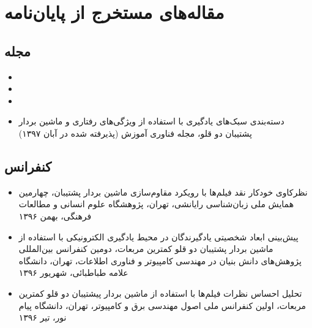 
{}

\chapter*{مقاله‌های مستخرج از پایان‌نامه}

\section*{مجله}
\begin{LTR}
	\begin{itemize}[label=$\bullet$]
		\item {}
		\item {}
		\item {}
	\end{itemize}
\end{LTR}

\begin{itemize}[label=$\bullet$]
	\item دسته‌بندی سبک‌های یادگیری با استفاده از ویژگی‌های رفتاری و ماشین بردار پشتیبان دو قلو، مجله فناوری آموزش (پذیرفته شده در آبان ۱۳۹۷)
\end{itemize}

\section*{کنفرانس}
\begin{itemize}[label=$\bullet$]
	\item نظرکاوی خودکار نقد فیلم‌ها با رویکرد مقاوم‌سازی ماشین بردار پشتیبان، چهارمین همایش ملی زبان‌شناسی رایانشی، تهران، پژوهشگاه علوم انسانی و مطالعات فرهنگی، بهمن ۱۳۹۶
	\item پیش‌بینی ابعاد شخصیتی یادگیرندگان در محیط یادگیری الکترونیکی با استفاده از ماشین بردار پشتیبان دو قلو کمترین مربعات، دومین کنفرانس بین‌المللی پژوهش‌های دانش بنیان در مهندسی کامپیوتر و فناوری اطلاعات، تهران، دانشگاه علامه طباطبائی، شهریور ۱۳۹۶
	\item تحلیل احساس نظرات فیلم‌ها با استفاده از ماشین بردار پیشتیبان دو قلو کمترین مربعات، اولین کنفرانس ملی اصول مهندسی برق و کامپیوتر، تهران، دانشگاه پیام نور، تیر ۱۳۹۶
\end{itemize}